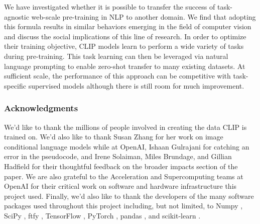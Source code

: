 \documentclass{article}
\begin{document}
We have investigated whether it is possible to transfer the success of task-agnostic web-scale pre-training in NLP to another domain. We find that adopting this formula results in similar behaviors emerging in the field of computer vision and discuss the social implications of this line of research. In order to optimize their training objective, CLIP models learn to perform a wide variety of tasks during pre-training. This task learning can then be leveraged via natural language prompting to enable zero-shot transfer to many existing datasets. At sufficient scale, the performance of this approach can be competitive with task-specific supervised models although there is still room for much improvement.
































\subsubsection*{Acknowledgments}
We'd like to thank the millions of people involved in creating the data CLIP is trained on. We'd also like to thank Susan Zhang for her work on image conditional language models while at OpenAI, Ishaan Gulrajani for catching an error in the pseudocode, and Irene Solaiman, Miles Brundage, and Gillian Hadfield for their thoughtful feedback on the broader impacts section of the paper. We are also grateful to the Acceleration and Supercomputing teams at OpenAI for their critical work on software and hardware infrastructure this project used. Finally, we'd also like to thank the developers of the many software packages used throughout this project including, but not limited, to Numpy \citep{2020NumPy-Array}, SciPy \citep{2020SciPy-NMeth}, ftfy \citep{speer-2019-ftfy}, TensorFlow \citep{abadi2016tensorflow}, PyTorch \citep{NEURIPS2019_9015}, pandas \citep{reback2020pandas}, and scikit-learn \citep{scikit-learn}.




\end{document}
